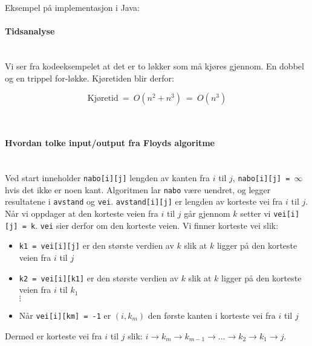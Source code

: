\noindent Eksempel på implementasjon i Java:

\paragraph{Tidsanalyse}~\\
Vi ser fra kodeeksempelet at det er to løkker som må kjøres gjennom. En dobbel og en trippel for-løkke. Kjøretiden blir derfor:

\[ \text{Kjøretid} ~=~ O\left(n^2 + n^3\right)  ~=~ O\left(n^3\right) \]

~\\
\paragraph{Hvordan tolke input/output fra Floyds algoritme}~\\
Ved start inneholder \verb|nabo[i][j]| lengden av kanten fra $ i $ til $ j $, \verb|nabo[i][j] = |$ \infty $ hvis det ikke er noen kant. Algoritmen lar \verb|nabo| være uendret, og legger resultatene i \verb|avstand| og \verb|vei|. \verb|avstand[i][j]| er lengden av korteste vei fra $ i $ til $ j $. Når vi oppdager at den korteste veien fra $ i $ til $ j $ går gjennom $ k $ setter vi \verb|vei[i][j] = k|. \verb|vei| sier derfor om den korteste veien. Vi finner korteste vei slik:
\begin{itemize}
\item \verb|k1 = vei[i][j]| er den største verdien av $ k $ slik at $ k $ ligger på den korteste veien fra $ i $ til $ j $
\item \verb|k2 = vei[i][k1]| er den største verdien av $ k $ slik at $ k $ ligger på den korteste veien fra $ i $ til $ k_1 $
\\ $ \vdots $
\item Når \verb|vei[i][km] = -1| er $ (i, k_m) $ den første kanten i korteste vei fra $ i $ til $ j $
\end{itemize}
Dermed er korteste vei fra $ i $ til $ j $ slik: $ i \rightarrow k_m \rightarrow k_{m-1} \rightarrow ... \rightarrow k_2 \rightarrow k_1 \rightarrow j $. 